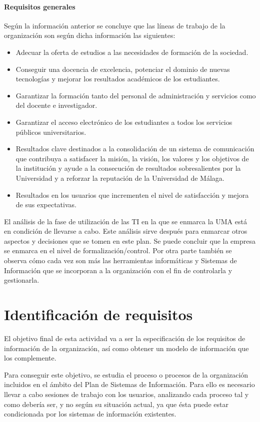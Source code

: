 \documentclass[11pt,a4paper,spanish,twoside]{book}
\begin{document}
\subsubsection{Requisitos generales}
Según la información anterior se concluye que las líneas de trabajo de
la organización son según dicha información las siguientes: 
\begin{itemize}
\item Adecuar la oferta de estudios a las necesidades de formación de la
  sociedad.
\item Conseguir una docencia de excelencia, potenciar el dominio de nuevas
  tecnologías y mejorar los resultados académicos de los estudiantes.
\item Garantizar la formación tanto del personal de administración y servicios
  como del docente e investigador.
\item Garantizar el acceso electrónico de los estudiantes a todos los servicios
  públicos universitarios.
\item Resultados clave destinados a la consolidación de un sistema de
  comunicación que contribuya a satisfacer la misión, la visión, los valores
  y los objetivos de la institución y ayude a la consecución de resultados
  sobresalientes por la Universidad y a reforzar la reputación de la
  Universidad de Málaga.
\item Resultados en los usuarios que incrementen el nivel de satisfacción y
  mejora de sus expectativas.
\end{itemize}
        
El análisis de la fase de utilización de las TI en la que se enmarca la 
UMA está en condición de llevarse a cabo. Este análisis sirve después
para enmarcar otros aspectos y decisiones que se tomen en este plan. Se puede
concluir que la empresa se enmarca en el nivel de formalización/control. Por
otra parte también se observa cómo cada vez son más las herramientas
informáticas y Sistemas de Información que se incorporan a la organización
con el fin de controlarla y gestionarla. 

\chapter{Identificación de requisitos}
El objetivo final de esta actividad va a ser la especificación de los
requisitos de información de la organización, así como obtener un modelo de
información que los complemente.

Para conseguir este objetivo, se estudia el proceso o procesos de la
organización incluidos en el ámbito del Plan de Sistemas de Información. Para
ello es necesario llevar a cabo sesiones de trabajo con los usuarios,
analizando cada proceso tal y como debería ser, y no según su situación
actual, ya que ésta puede estar condicionada por los sistemas de información
existentes. 
\end{document}

